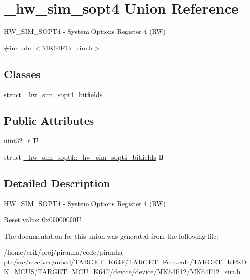 \hypertarget{union__hw__sim__sopt4}{}\section{\+\_\+hw\+\_\+sim\+\_\+sopt4 Union Reference}
\label{union__hw__sim__sopt4}


H\+W\+\_\+\+S\+I\+M\+\_\+\+S\+O\+P\+T4 -\/ System Options Register 4 (RW)  




{\ttfamily \#include $<$M\+K64\+F12\+\_\+sim.\+h$>$}

\subsection*{Classes}
\begin{DoxyCompactItemize}
\item 
struct \hyperlink{struct__hw__sim__sopt4_1_1__hw__sim__sopt4__bitfields}{\+\_\+hw\+\_\+sim\+\_\+sopt4\+\_\+bitfields}
\end{DoxyCompactItemize}
\subsection*{Public Attributes}
\begin{DoxyCompactItemize}
\item 
uint32\+\_\+t {\bfseries U}\hypertarget{union__hw__sim__sopt4_a858e34011e92007a7926e1459bcb6529}{}\label{union__hw__sim__sopt4_a858e34011e92007a7926e1459bcb6529}

\item 
struct \hyperlink{struct__hw__sim__sopt4_1_1__hw__sim__sopt4__bitfields}{\+\_\+hw\+\_\+sim\+\_\+sopt4\+::\+\_\+hw\+\_\+sim\+\_\+sopt4\+\_\+bitfields} {\bfseries B}\hypertarget{union__hw__sim__sopt4_ac753780c69deeb259f75a8869f609aea}{}\label{union__hw__sim__sopt4_ac753780c69deeb259f75a8869f609aea}

\end{DoxyCompactItemize}


\subsection{Detailed Description}
H\+W\+\_\+\+S\+I\+M\+\_\+\+S\+O\+P\+T4 -\/ System Options Register 4 (RW) 

Reset value\+: 0x00000000U 

The documentation for this union was generated from the following file\+:\begin{DoxyCompactItemize}
\item 
/home/erik/proj/piranha/code/piranha-\/ptc/src/receiver/mbed/\+T\+A\+R\+G\+E\+T\+\_\+\+K64\+F/\+T\+A\+R\+G\+E\+T\+\_\+\+Freescale/\+T\+A\+R\+G\+E\+T\+\_\+\+K\+P\+S\+D\+K\+\_\+\+M\+C\+U\+S/\+T\+A\+R\+G\+E\+T\+\_\+\+M\+C\+U\+\_\+\+K64\+F/device/device/\+M\+K64\+F12/M\+K64\+F12\+\_\+sim.\+h\end{DoxyCompactItemize}

